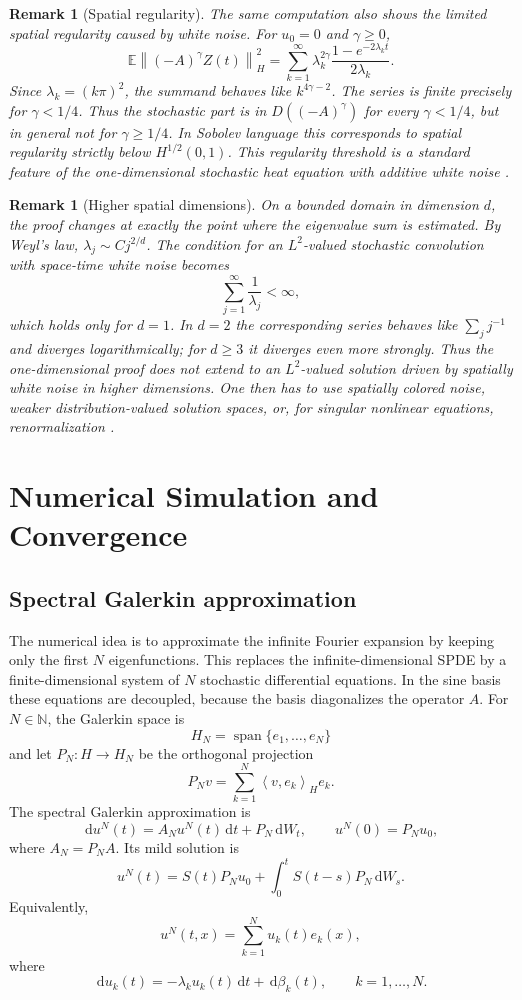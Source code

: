 \documentclass[11pt,a4paper]{article}
\newtheorem{remark}[theorem]{Remark}
\newcommand{\N}{\mathbb{N}}
\newcommand{\E}{\mathbb{E}}
\newcommand{\dd}{\,\mathrm{d}}
\newcommand{\norm}[1]{\left\lVert #1 \right\rVert}
\newcommand{\ip}[2]{\left\langle #1,#2 \right\rangle}
\begin{document}
\begin{remark}[Spatial regularity]
The same computation also shows the limited spatial regularity caused by white
noise. For \(u_0=0\) and \(\gamma\ge0\),
\[
  \E\norm{(-A)^\gamma Z(t)}_H^2
  =
  \sum_{k=1}^{\infty}
  \lambda_k^{2\gamma}
  \frac{1-e^{-2\lambda_k t}}{2\lambda_k}.
\]
Since \(\lambda_k=(k\pi)^2\), the summand behaves like
\(k^{4\gamma-2}\). The series is finite precisely for
\(\gamma<1/4\). Thus the stochastic part is in
\(D((-A)^\gamma)\) for every \(\gamma<1/4\), but in general not for
\(\gamma\ge1/4\). In Sobolev language this corresponds to spatial regularity
strictly below \(H^{1/2}(0,1)\). This regularity threshold is a standard
feature of the one-dimensional stochastic heat equation with additive white
noise \cite{daPratoZabczyk,hairer2009}.
\end{remark}

\begin{remark}[Higher spatial dimensions]
On a bounded domain in dimension \(d\), the proof changes at exactly the point
where the eigenvalue sum is estimated. By Weyl's law,
\(\lambda_j\sim Cj^{2/d}\). The condition for an \(L^2\)-valued stochastic
convolution with space-time white noise becomes
\[
  \sum_{j=1}^{\infty}\frac1{\lambda_j}<\infty,
\]
which holds only for \(d=1\). In \(d=2\) the corresponding series behaves like
\(\sum_j j^{-1}\) and diverges logarithmically; for \(d\ge3\) it diverges even
more strongly. Thus the one-dimensional proof does not extend to an
\(L^2\)-valued solution driven by spatially white noise in higher dimensions.
One then has to use spatially colored noise, weaker distribution-valued
solution spaces, or, for singular nonlinear equations, renormalization
\cite{daPratoZabczyk,hairer2009}.
\end{remark}

\section{Numerical Simulation and Convergence}

\subsection{Spectral Galerkin approximation}

The numerical idea is to approximate the infinite Fourier expansion by keeping
only the first \(N\) eigenfunctions. This replaces the infinite-dimensional
SPDE by a finite-dimensional system of \(N\) stochastic differential equations.
In the sine basis these equations are decoupled, because the basis diagonalizes
the operator \(A\). For \(N\in\N\), the Galerkin space is
\[
  H_N=\operatorname{span}\{e_1,\dots,e_N\}
\]
and let \(P_N:H\to H_N\) be the orthogonal projection
\[
  P_Nv=\sum_{k=1}^{N}\ip{v}{e_k}_H e_k.
\]
The spectral Galerkin approximation is
\[
  \dd u^N(t)=A_Nu^N(t)\dd t+P_N\dd W_t,
  \qquad
  u^N(0)=P_Nu_0,
\]
where \(A_N=P_NA\). Its mild solution is
\[
  u^N(t)
  =
  S(t)P_Nu_0
  +
  \int_0^t S(t-s)P_N\dd W_s.
\]
Equivalently,
\[
  u^N(t,x)=\sum_{k=1}^{N}u_k(t)e_k(x),
\]
where
\[
  \dd u_k(t)=-\lambda_k u_k(t)\dd t+\dd\beta_k(t),
  \qquad k=1,\dots,N.
\]
\end{document}
